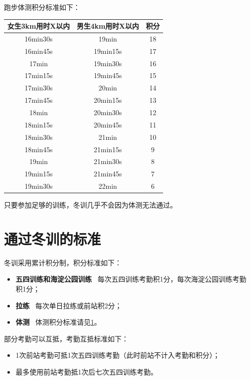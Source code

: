 \documentclass[UTF8]{ctexart}
\begin{document}
跑步体测积分标准如下：

\begin{table}[h]
    \centering
    \begin{tabular}{|c|c|c|}
    \hline
    女生3km用时X以内 & 男生4km用时X以内 & 积分 \\ \hline
    16min30s   & 19min      & 18 \\ \hline
    16min45s   & 19min15s   & 17 \\ \hline
    17min      & 19min30s   & 16 \\ \hline
    17min15s   & 19min45s   & 15 \\ \hline
    17min30s   & 20min      & 14 \\ \hline
    17min45s   & 20min15s   & 13 \\ \hline
    18min      & 20min30s   & 12 \\ \hline
    18min15s   & 20min45s   & 11 \\ \hline
    18min30s   & 21min      & 10 \\ \hline
    18min45s   & 21min15s   & 9  \\ \hline
    19min      & 21min30s   & 8  \\ \hline
    19min15s   & 21min45s   & 7  \\ \hline
    19min30s   & 22min      & 6  \\ \hline
    \end{tabular}\label{test}
    \end{table}

只要参加足够的训练，冬训几乎不会因为体测无法通过。 

\section{通过冬训的标准}

冬训采用累计积分制，积分标准如下：

\begin{itemize}[nosep,left=4em]
    \item \textbf{五四训练和海淀公园训练} \ 每次五四训练考勤积1分，每次海淀公园训练考勤积1分；
    \item \textbf{拉练} \  每次单日拉练或前站积2分；
    \item \textbf{体测} \  体测积分标准请见\ref{test}。 
\end{itemize}

部分考勤可以互抵，考勤互抵标准如下：

\begin{itemize}[nosep,left=4em]
    \item 1次前站考勤可抵1次五四训练考勤（此时前站不计入考勤和积分）；
    \item 最多使用前站考勤抵1次后七次五四训练考勤。 
\end{itemize}
\end{document}
